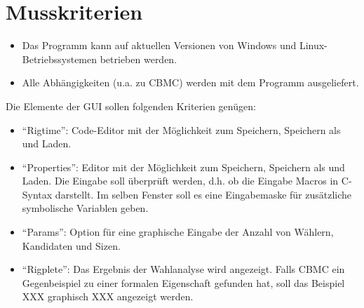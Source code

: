 \documentclass[a4paper]{scrreprt}
\begin{document}
\section{Musskriterien}
\begin{itemize}
\item Das Programm kann auf aktuellen Versionen von Windows und Linux-Betriebssystemen betrieben werden.
\item Alle Abhängigkeiten (u.a. zu CBMC) werden mit dem Programm ausgeliefert.
\end{itemize}
Die Elemente der GUI sollen folgenden Kriterien genügen:
\begin{itemize}
\item "`Rigtime"': Code-Editor mit der Möglichkeit zum Speichern, Speichern als und Laden.
\item "`Properties"': Editor mit der Möglichkeit zum Speichern, Speichern als und Laden. Die Eingabe soll überprüft werden, d.h. ob die Eingabe Macros in C-Syntax darstellt. Im selben Fenster soll es eine Eingabemaske für zusätzliche symbolische Variablen geben.
\item "`Params"': Option für eine graphische Eingabe der Anzahl von Wählern, Kandidaten und Sizen.
\item "`Rigplete"': Das Ergebnis der Wahlanalyse wird angezeigt. Falls CBMC ein Gegenbeispiel zu einer formalen Eigenschaft gefunden hat, soll das Beispiel XXX graphisch XXX angezeigt werden.
\end{itemize}
\end{document}
